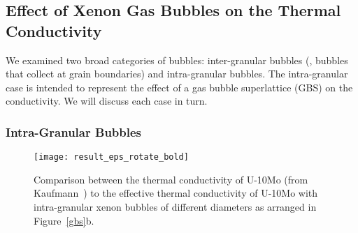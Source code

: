 \subsection{Effect of Xenon Gas Bubbles on the Thermal Conductivity} 
\label{subsec:xenonbubble}
We examined two broad categories of bubbles: inter-granular bubbles (\ie,
bubbles that collect at grain boundaries) and intra-granular bubbles.
The intra-granular case is intended to represent the effect of a gas bubble
superlattice (GBS) on the conductivity. We will discuss each case in turn.

\subsubsection{Intra-Granular Bubbles}
\begin{figure}%
\centering
\texttt{[image: result\_eps\_rotate\_bold]}
\caption[Comparison between the thermal conductivity of \mbox{U-10Mo}
  (from Kaufmann) to the effective thermal
  conductivity of \mbox{U-10Mo} with intra-granular xenon bubbles of different
  diameters as arranged in Figure~\ref{gbs}b.]{Comparison between the thermal conductivity of \mbox{U-10Mo}
  (from Kaufmann~\cite{kaufmann1962nuclear}) to the effective thermal
  conductivity of \mbox{U-10Mo} with intra-granular xenon bubbles of different
  diameters as arranged in Figure~\ref{gbs}b.}
\label{fig_result_intra}
\end{figure}

